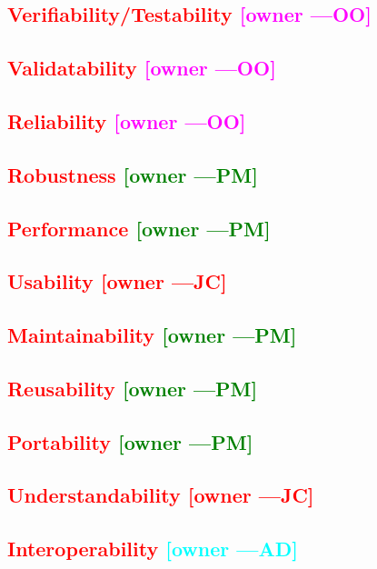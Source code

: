 \documentclass[letterpaper,cleveref]{lipics-v2019}
\newcommand{\authornote}[3]{\textcolor{#1}{[#3 ---#2]}}
\newcommand{\authornote}[3]{}
\newcommand{\jc}[1]{\authornote{red}{JC}{#1}} %
\newcommand{\oo}[1]{\authornote{magenta}{OO}{#1}} %
\newcommand{\pmi}[1]{\authornote{green}{PM}{#1}} %
\newcommand{\ad}[1]{\authornote{cyan}{AD}{#1}} %
\newcommand{\notdone}[1]{\textcolor{red}{#1}}
\theoremstyle{definition}
\begin{document}
\subsection{\notdone{Verifiability/Testability} \oo{owner}}

\subsection{\notdone{Validatability} \oo{owner}}

\subsection{\notdone{Reliability} \oo{owner}}

\subsection{\notdone{Robustness} \pmi{owner}}

\subsection{\notdone{Performance} \pmi{owner}}

\subsection{\notdone{Usability} \jc{owner}} 

\subsection{\notdone{Maintainability} \pmi{owner}}

\subsection{\notdone{Reusability} \pmi{owner}}

\subsection{\notdone{Portability} \pmi{owner}}

\subsection{\notdone{Understandability} \jc{owner}}

\subsection{\notdone{Interoperability} \ad{owner}}
\end{document}
